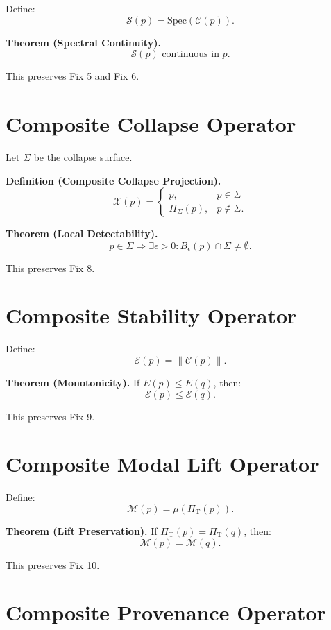 \documentclass[11pt]{article}
\begin{document}
Define:
\[
\mathcal{S}(p) = \mathrm{Spec}(\mathcal{C}(p)).
\]

\textbf{Theorem (Spectral Continuity).}
\[
\mathcal{S}(p) \text{ continuous in } p.
\]

This preserves Fix 5 and Fix 6.

\section{Composite Collapse Operator}

Let $\Sigma$ be the collapse surface.

\textbf{Definition (Composite Collapse Projection).}
\[
\mathcal{X}(p) =
\begin{cases}
p, & p \in \Sigma \\
\Pi_{\Sigma}(p), & p \notin \Sigma.
\end{cases}
\]

\textbf{Theorem (Local Detectability).}
\[
p \in \Sigma \Rightarrow \exists \epsilon > 0 :
B_\epsilon(p) \cap \Sigma \neq \emptyset.
\]

This preserves Fix 8.

\section{Composite Stability Operator}

Define:
\[
\mathcal{E}(p) = \|\mathcal{C}(p)\|.
\]

\textbf{Theorem (Monotonicity).}
If $E(p) \le E(q)$, then:
\[
\mathcal{E}(p) \le \mathcal{E}(q).
\]

This preserves Fix 9.

\section{Composite Modal Lift Operator}

Define:
\[
\mathcal{M}(p) = \mu(\Pi_{\mathrm{T}}(p)).
\]

\textbf{Theorem (Lift Preservation).}
If $\Pi_{\mathrm{T}}(p) = \Pi_{\mathrm{T}}(q)$, then:
\[
\mathcal{M}(p) = \mathcal{M}(q).
\]

This preserves Fix 10.

\section{Composite Provenance Operator}
\end{document}
